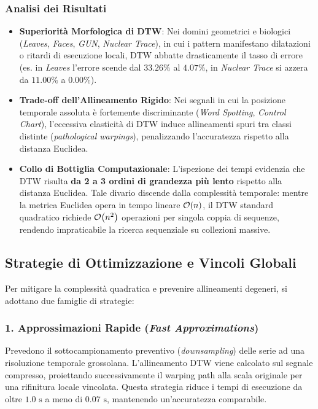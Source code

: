 \subsubsection{Analisi dei Risultati}
\begin{itemize}
    \item \textbf{Superiorit\`a Morfologica di DTW}: Nei domini geometrici e biologici (\textit{Leaves}, \textit{Faces}, \textit{GUN}, \textit{Nuclear Trace}), in cui i pattern manifestano dilatazioni o ritardi di esecuzione locali, DTW abbatte drasticamente il tasso di errore (es. in \textit{Leaves} l'errore scende dal $33.26\%$ al $4.07\%$, in \textit{Nuclear Trace} si azzera da $11.00\%$ a $0.00\%$).
    \item \textbf{Trade-off dell'Allineamento Rigido}: Nei segnali in cui la posizione temporale assoluta \`e fortemente discriminante (\textit{Word Spotting}, \textit{Control Chart}), l'eccessiva elasticit\`a di DTW induce allineamenti spuri tra classi distinte (\textit{pathological warpings}), penalizzando l'accuratezza rispetto alla distanza Euclidea.
    \item \textbf{Collo di Bottiglia Computazionale}: L'ispezione dei tempi evidenzia che DTW risulta \textbf{da 2 a 3 ordini di grandezza pi\`u lento} rispetto alla distanza Euclidea. Tale divario discende dalla complessit\`a temporale: mentre la metrica Euclidea opera in tempo lineare $\mathcal{O}\!\left(n\right)$, il DTW standard quadratico richiede $\mathcal{O}\!\left(n^2\right)$ operazioni per singola coppia di sequenze, rendendo impraticabile la ricerca sequenziale su collezioni massive.
\end{itemize}

\FloatBarrier
\subsection{Strategie di Ottimizzazione e Vincoli Globali}
\label{subsec:ts-optimizations-global-constraints}

Per mitigare la complessit\`a quadratica e prevenire allineamenti degeneri, si adottano due famiglie di strategie:

\subsubsection{1. Approssimazioni Rapide (\textit{Fast Approximations})}
Prevedono il sottocampionamento preventivo (\textit{downsampling}) delle serie ad una risoluzione temporale grossolana. L'allineamento DTW viene calcolato sul segnale compresso, proiettando successivamente il warping path alla scala originale per una rifinitura locale vincolata. Questa strategia riduce i tempi di esecuzione da oltre $1.0\text{ s}$ a meno di $0.07\text{ s}$, mantenendo un'accuratezza comparabile.

